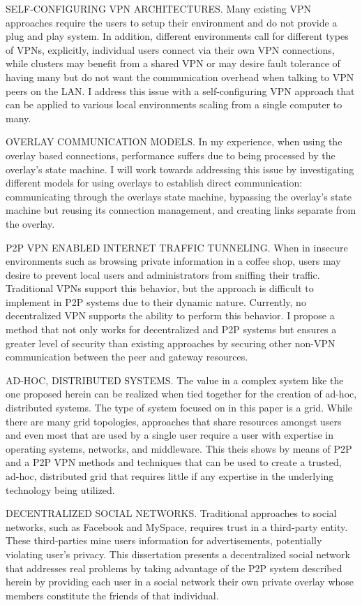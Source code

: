 SELF-CONFIGURING VPN ARCHITECTURES. Many existing VPN approaches require the
users to setup their environment and do not provide a plug and play system.  In
addition, different environments call for different types of VPNs, explicitly,
individual users connect via their own VPN connections, while clusters may
benefit from a shared VPN or may desire fault tolerance of having many but do
not want the communication overhead when talking to VPN peers on the LAN.  I
address this issue with a self-configuring VPN approach that can be applied to
various local environments scaling from a single computer to many.

OVERLAY COMMUNICATION MODELS. In my experience, when using the overlay based
connections, performance suffers due to being processed by the overlay's state
machine.  I will work towards addressing this issue by investigating different
models for using overlays to establish direct communication: communicating
through the overlays state machine, bypassing the overlay's state machine but
reusing its connection management, and creating links separate from the
overlay.

P2P VPN ENABLED INTERNET TRAFFIC TUNNELING. When in insecure environments such
as browsing private information in a coffee shop, users may desire to prevent
local users and administrators from sniffing their traffic.  Traditional VPNs
support this behavior, but the approach is difficult to implement in P2P
systems due to their dynamic nature.  Currently, no decentralized VPN supports
the ability to perform this behavior.  I propose a method that not only works
for decentralized and P2P systems but ensures a greater level of security than
existing approaches by securing other non-VPN communication between the peer
and gateway resources.

AD-HOC, DISTRIBUTED SYSTEMS. The value in a complex system like the one
proposed herein can be realized when tied together for the creation of ad-hoc,
distributed systems.  The type of system focused on in this paper is a grid.
While there are many grid topologies, approaches that share resources amongst
users and even most that are used by a single user require a user with
expertise in operating systems, networks, and middleware.  This theis shows by
means of P2P and a P2P VPN methods and techniques that can be used to create a
trusted, ad-hoc, distributed grid that requires little if any expertise in the
underlying technology being utilized.

DECENTRALIZED SOCIAL NETWORKS. Traditional approaches to social networks, such
as Facebook and MySpace, requires trust in a third-party entity.  These
third-parties mine users information for advertisements, potentially violating
user's privacy.  This dissertation presents a decentralized social network that
addresses real problems by taking advantage of the P2P system described herein
by providing each user in a social network their own private overlay whose
members constitute the friends of that individual.

